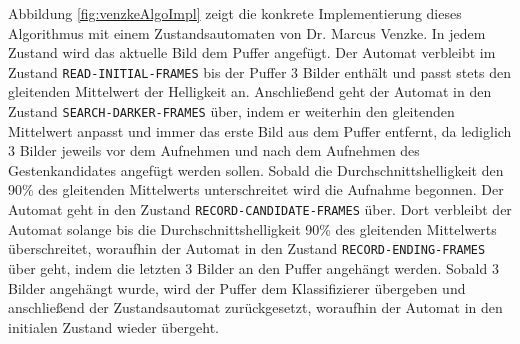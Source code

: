 Abbildung \ref{fig:venzkeAlgoImpl} zeigt die konkrete Implementierung dieses Algorithmus mit einem Zustandsautomaten von Dr. Marcus Venzke. In jedem Zustand wird das aktuelle Bild dem Puffer angefügt. Der Automat
verbleibt im Zustand \texttt{READ-INITIAL-FRAMES} bis der Puffer 3 Bilder enthält und passt stets den gleitenden Mittelwert der Helligkeit an. Anschließend geht der Automat in den Zustand
\texttt{SEARCH-DARKER-FRAMES} über, indem er weiterhin den gleitenden Mittelwert anpasst und immer das erste Bild aus dem Puffer entfernt, da lediglich 3 Bilder jeweils vor dem Aufnehmen und nach dem Aufnehmen des
Gestenkandidates angefügt werden sollen. Sobald die Durchschnittshelligkeit den 90\% des gleitenden Mittelwerts unterschreitet wird die Aufnahme begonnen. Der Automat geht in den Zustand \texttt{RECORD-CANDIDATE-FRAMES}
über. Dort verbleibt der Automat solange bis die Durchschnittshelligkeit 90\% des gleitenden Mittelwerts überschreitet, woraufhin der Automat in den Zustand \texttt{RECORD-ENDING-FRAMES} über geht, indem die letzten 3
Bilder an den Puffer angehängt werden. Sobald 3 Bilder angehängt wurde, wird der Puffer dem Klassifizierer übergeben und anschließend der Zustandsautomat zurückgesetzt, woraufhin der Automat in den initialen
Zustand wieder übergeht.